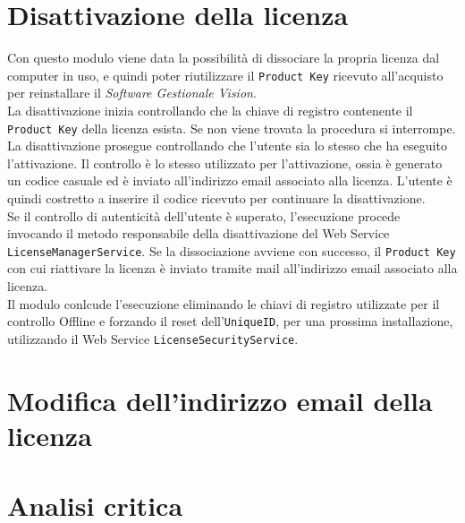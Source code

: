 \section{Disattivazione della licenza}

Con questo modulo viene data la possibilità di dissociare la propria licenza dal computer in uso, e quindi poter riutilizzare il \texttt{Product Key} ricevuto all’acquisto per reinstallare il \textit{Software Gestionale Vision}.\\
La disattivazione inizia controllando che la chiave di registro contenente il \texttt{Product Key} della licenza esista. Se non viene trovata la procedura si interrompe.\\
La disattivazione prosegue controllando che l'utente sia lo stesso che ha eseguito l'attivazione. Il controllo è lo stesso utilizzato per l'attivazione, ossia è generato un codice casuale ed è inviato all'indirizzo email associato alla licenza. L'utente è quindi costretto a inserire il codice ricevuto per continuare la disattivazione.
\\Se il controllo di autenticità dell'utente è superato, l’esecuzione procede invocando il metodo responsabile della disattivazione del Web Service \texttt{LicenseManagerService}. Se la dissociazione  avviene con successo, il \texttt{Product Key} con cui riattivare la licenza è inviato tramite mail all’indirizzo email associato alla licenza.\\
Il modulo conlcude l'esecuzione eliminando le chiavi di registro utilizzate per il controllo Offline e forzando il reset dell’\texttt{UniqueID}, per una prossima installazione, utilizzando il Web Service \texttt{LicenseSecurityService}. 



\section{Modifica dell'indirizzo email della licenza}



\section{Analisi critica}